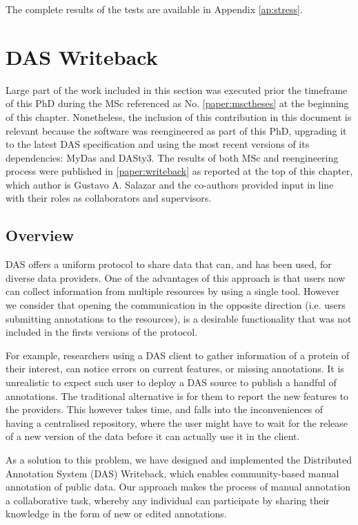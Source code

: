 The complete results of the tests are available in Appendix \ref{ap:stress}.









\section{DAS Writeback}\label{section:writeback}

Large part of the work included in this section was executed prior the timeframe of this PhD during the MSc referenced as No. \ref{paper:msctheses} at the beginning of this chapter. Nonetheless, the inclusion of this contribution in this document is relevant because the software was reengineered as part of this PhD, upgrading it to the latest DAS specification and using the most recent versions of its dependencies: MyDas and DASty3. The results of both MSc and reengineering process were published in \ref{paper:writeback} as reported at the top of this chapter, which author is Gustavo A. Salazar and the co-authors provided input in line with their roles as collaborators and supervisors. 

\subsection{Overview}
DAS offers a uniform protocol to share data that can, and has been used, for diverse data providers. One of the advantages of this approach is that users now can collect information from multiple resources by using a single tool. However we consider that opening the communication in the opposite direction (i.e. users submitting annotations to the resources), is a desirable functionality that was not included in the firsts versions of the protocol.

For example, researchers using a DAS client to gather information of a protein of their interest, can notice errors on current features, or missing annotations. It is unrealistic to expect such user to deploy a DAS source to publish a handful of annotations. The traditional alternative is for them to report the new features to the providers. This however takes time, and falls into the inconveniences of having a centralised repository, where the user might have to wait for the release of a new version of the data before it can actually use it in the client.

As a solution to this problem, we have designed and implemented the Distributed Annotation System (DAS) Writeback, which enables community-based manual annotation of public data. Our approach makes the process of manual annotation a collaborative task, whereby any individual can participate by sharing their knowledge in the form of new or edited annotations.

